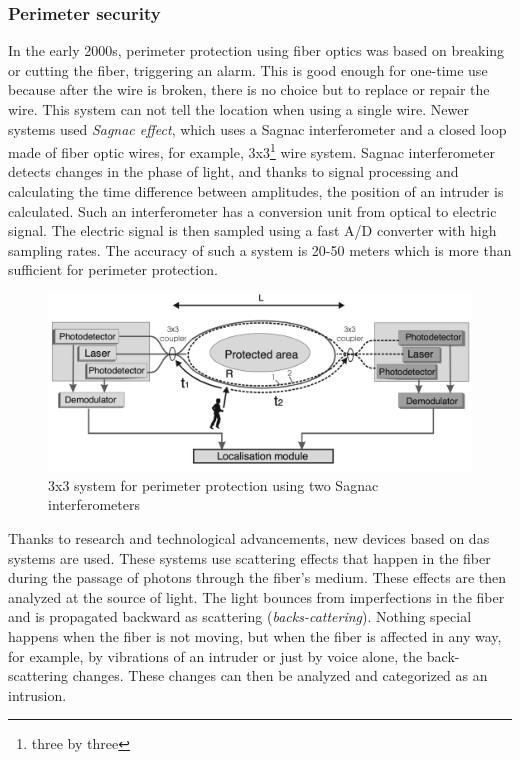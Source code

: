 \subsubsection{Perimeter security}\label{txt.perimeter.security}

In the early 2000s, perimeter protection using fiber optics was based on breaking or cutting the fiber, triggering an alarm. This is good enough for one-time use because after the wire is broken, there is no choice but to replace or repair the wire. This system can not tell the location when using a single wire. Newer systems used \textit{Sagnac effect}, which uses a Sagnac interferometer and a closed loop made of fiber optic wires, for example, 3x3\footnote{three by three} wire system. Sagnac interferometer detects changes in the phase of light, and thanks to signal processing and calculating the time difference between amplitudes, the position of an intruder is calculated. Such an interferometer has a conversion unit from optical to electric signal. The electric signal is then sampled using a fast A/D converter with high sampling rates. The accuracy of such a system is 20-50 meters which is more than sufficient for perimeter protection\cite{perimeterpolsko}. 

\begin{figure}
    \centering
    \includegraphics[width=\linewidth]{obrazky/sagnac_interrogator.png}
    \caption{3x3 system for perimeter protection using two Sagnac interferometers\cite{perimeterpolsko}}
    \label{fig:sagnac}
\end{figure}

Thanks to research and technological advancements, new devices based on \ac{das} systems are used. These systems use scattering effects that happen in the fiber during the passage of photons through the fiber's medium. These effects are then analyzed at the source of light. The light bounces from imperfections in the fiber and is propagated backward as scattering (\textit{backs-cattering}). Nothing special happens when the fiber is not moving, but when the fiber is affected in any way, for example, by vibrations of an intruder or just by voice alone, the back-scattering changes. These changes can then be analyzed and categorized as an intrusion.


